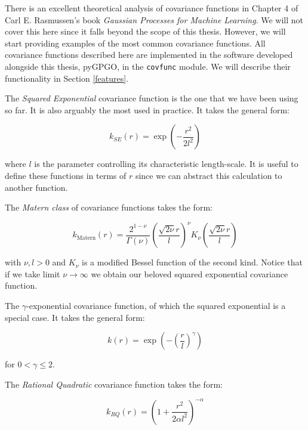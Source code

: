 \documentclass[10pt,a4paper,twoside]{book}
\begin{document}
There is an excellent theoretical analysis of covariance functions in Chapter 4 of Carl E. Rasmussen's book \textit{Gaussian Processes for Machine Learning}. We will not cover this here since it falls beyond the scope of this thesis. However, we will start providing examples of the most common covariance functions. All covariance functions described here are implemented in the software developed alongside this thesis, pyGPGO, in the \texttt{covfunc} module. We will describe their functionality in Section \ref{features}.

The \textit{Squared Exponential} covariance function is the one that we have been using so far. It is also arguably the most used in practice. It takes the general form:

\begin{equation}
k_{SE}(r) = \exp\left(-\dfrac{r^2}{2l^2} \right)
\end{equation}

where $l$ is the parameter controlling its characteristic length-scale. It is useful to define these functions in terms of $r$ since we can abstract this calculation to another function. 

The \textit{Matern class} of covariance functions takes the form:

\begin{equation}
k_{\textrm{Matern}}(r) = \dfrac{2^{1-\nu}}{\Gamma(\nu)}\left(\dfrac{\sqrt{2\nu} r}{l}    \right)^\nu K_\nu\left( \dfrac{\sqrt{2\nu}r}{l} \right)
\end{equation}

with $\nu, l > 0$ and $K_\nu$ is a modified Bessel function of the second kind. Notice that if we take limit $\nu \rightarrow \infty$ we obtain our beloved squared exponential covariance function.


The $\gamma$-exponential covariance function, of which the squared exponential is a special case. It takes the general form:

\begin{equation}
k(r) = \exp\left( - \left(\dfrac{r}{l}\right)^\gamma  \right)
\end{equation}

for $0 < \gamma \leq 2$. 

The \textit{Rational Quadratic} covariance function takes the form:

\begin{equation}
k_{RQ}(r) = \left( 1 + \dfrac{r^2}{2\alpha l^2} \right)^{-\alpha}
\end{equation}
\end{document}
